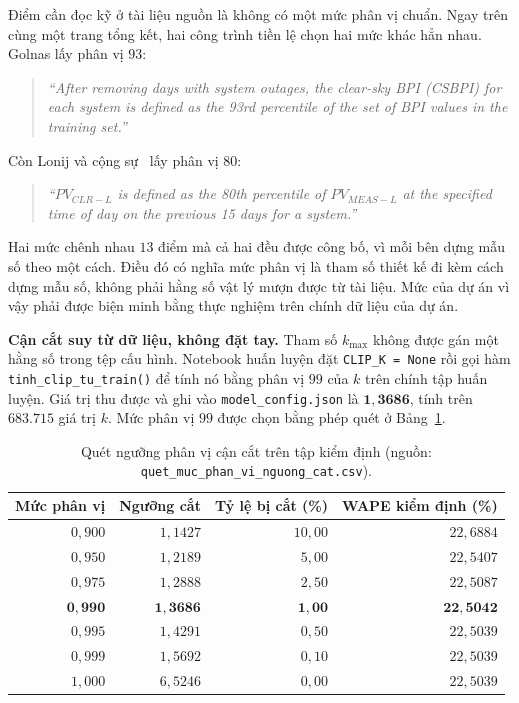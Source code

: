 Điểm cần đọc kỹ ở tài liệu nguồn là không có một mức phân vị chuẩn. Ngay trên cùng
một trang tổng kết, hai công trình tiền lệ chọn hai mức khác hẳn nhau. Golnas lấy
phân vị $93$:

\begin{quote}\small
\textit{``After removing days with system outages, the clear-sky BPI (CSBPI) for each system is defined as the 93rd percentile of the set of BPI values in the training set.''}
\end{quote}

Còn Lonij và cộng sự~\cite{lonij2012tucson} lấy phân vị $80$:

\begin{quote}\small
\textit{``$PV_{CLR-L}$ is defined as the 80th percentile of $PV_{MEAS-L}$ at the specified time of day on the previous 15 days for a system.''}
\end{quote}


Hai mức chênh nhau $13$ điểm mà cả hai đều được công bố, vì mỗi bên dựng mẫu số theo một cách.
Điều đó có nghĩa mức phân vị là tham số thiết kế đi kèm cách dựng mẫu số, không phải
hằng số vật lý mượn được từ tài liệu. Mức của dự án vì vậy phải được biện minh bằng thực
nghiệm trên chính dữ liệu của dự án.

\textbf{Cận cắt suy từ dữ liệu, không đặt tay.} Tham số $k_{\max}$ không được gán một hằng số
trong tệp cấu hình. Notebook huấn luyện đặt \texttt{CLIP\_K = None} rồi gọi hàm
\texttt{tinh\_clip\_tu\_train()} để tính nó bằng phân vị $99$ của $k$ trên chính tập huấn luyện.
Giá trị thu được và ghi vào \texttt{model\_config.json} là $\mathbf{1{,}3686}$, tính trên
$683.715$ giá trị $k$. Mức phân vị $99$ được chọn bằng phép quét ở
Bảng~\ref{tab:quet_phan_vi}.

\begin{table}[htbp]
\centering
\caption{Quét ngưỡng phân vị cận cắt trên tập kiểm định (nguồn: \texttt{quet\_muc\_phan\_vi\_nguong\_cat.csv}).}
\label{tab:quet_phan_vi}
\small
\begin{tabular}{r r r r}
\toprule
\textbf{Mức phân vị} & \textbf{Ngưỡng cắt} & \textbf{Tỷ lệ bị cắt (\%)} & \textbf{WAPE kiểm định (\%)} \\
\midrule
$0{,}900$ & $1{,}1427$ & $10{,}00$ & $22{,}6884$ \\
$0{,}950$ & $1{,}2189$ & $5{,}00$  & $22{,}5407$ \\
$0{,}975$ & $1{,}2888$ & $2{,}50$  & $22{,}5087$ \\
$\mathbf{0{,}990}$ & $\mathbf{1{,}3686}$ & $\mathbf{1{,}00}$ & $\mathbf{22{,}5042}$ \\
$0{,}995$ & $1{,}4291$ & $0{,}50$  & $22{,}5039$ \\
$0{,}999$ & $1{,}5692$ & $0{,}10$  & $22{,}5039$ \\
$1{,}000$ & $6{,}5246$ & $0{,}00$ & $22{,}5039$ \\
\bottomrule
\end{tabular}
\end{table}


